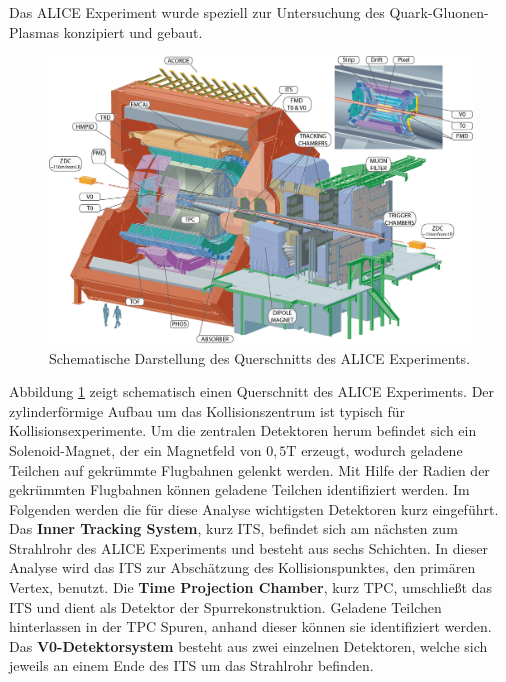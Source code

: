 Das ALICE Experiment wurde speziell zur Untersuchung des Quark-Gluonen-Plasmas konzipiert und gebaut.
\begin{figure}[tp]
\centering
\includegraphics[width=.9\linewidth]{ALICE.jpg}
\caption{Schematische Darstellung des Querschnitts des ALICE Experiments.
\cite{WEBSITE:1}}
\label{fig:ALICE}
\end{figure}
Abbildung \ref{fig:ALICE} zeigt schematisch einen Querschnitt des ALICE Experiments. Der zylinderförmige Aufbau um das Kollisionszentrum ist typisch für Kollisionsexperimente.
\newline
Um die zentralen Detektoren herum befindet sich ein Solenoid-Magnet, der ein Magnetfeld von $0,5 \text{T}$ erzeugt, wodurch geladene Teilchen auf gekrümmte Flugbahnen gelenkt werden.
Mit Hilfe der Radien der gekrümmten Flugbahnen können geladene Teilchen identifiziert werden.
Im Folgenden werden die für diese Analyse wichtigsten Detektoren kurz eingeführt.
\newline
Das \textbf{Inner Tracking System}, kurz ITS, befindet sich am nächsten zum Strahlrohr des ALICE Experiments und besteht aus sechs Schichten.
In dieser Analyse wird das ITS zur Abschätzung des Kollisionspunktes, den primären Vertex, benutzt.
\newline
Die \textbf{Time Projection Chamber}, kurz TPC, umschließt das ITS und dient als Detektor der Spurrekonstruktion.
Geladene Teilchen hinterlassen in der TPC Spuren, anhand dieser können sie identifiziert werden.
\newline
Das \textbf{V0-Detektorsystem} besteht aus zwei einzelnen Detektoren, welche sich jeweils an einem Ende des ITS um das Strahlrohr befinden.
